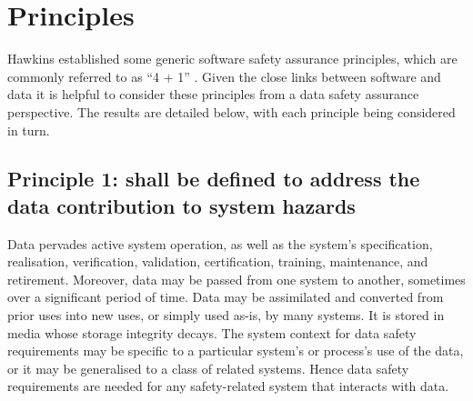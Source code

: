 %
%
\cbstart\chapter{Principles} \label{bkm:principles}\cbend

Hawkins  established some generic software safety assurance principles, which are commonly referred to as ``4 + 1'' \cite{citation:hawkins2013principles}. Given the close links between software and data it is helpful to consider these principles from a data safety assurance perspective. The results are detailed below, with each principle being considered in turn.

\section{Principle 1:  shall be defined to address the data contribution to system hazards}
Data pervades active system operation, as well as the system's specification, realisation, \gls{verification}, \gls{validation}, certification,  training, maintenance, and retirement. Moreover, data may be passed from one system to another, sometimes over a significant period of time. Data may be assimilated and converted from prior uses into new uses, or simply used as-is, by many systems. It is stored in media whose storage \gls{integrity} decays. The system context for \glspl{data safety requirement} may be specific to a particular system's or process's use of the data, or it may be generalised to a class of related systems. Hence \glspl{data safety requirement} are needed for any safety-related system that interacts with data. 
